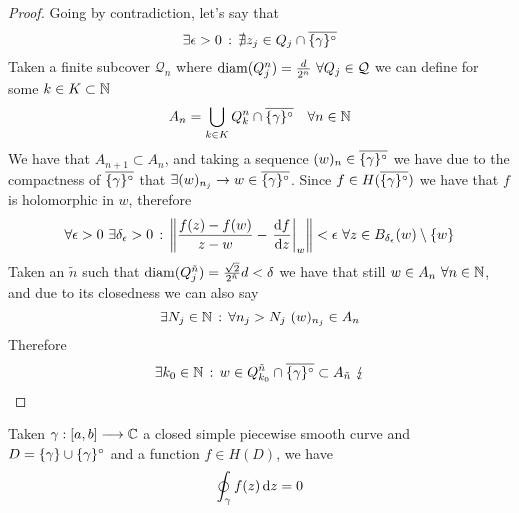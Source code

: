 \documentclass[../complete.tex]{subfiles}
\begin{document}
\begin{proof}
	Going by contradiction, let's say that
	\begin{equation*}
		\exists\epsilon>0\, :\, \nexists z_j\in Q_j\cap\overline{\{\gamma\}^{\circ}}
	\end{equation*}
	Taken a finite subcover $\mathcal{Q}_n$ where $\operatorname{diam}(Q^n_j)=\frac{d}{2^n}\ \forall Q_j\in\mathcal{Q}$ we can define for some $k\in K\subset\mathbb{N}$
	\begin{equation*}
		A_n=\bigcup_{k\in K}Q^n_{k}\cap\overline{\{\gamma\}^{\circ}}\quad\forall n\in\mathbb{N}
	\end{equation*}
	We have that $A_{n+1}\subset A_n$, and taking a sequence $(w)_n\in\overline{\{\gamma\}^{\circ}}$ we have due to the compactness of $\overline{\{\gamma\}^{\circ}}$ that $\exists(w)_{n_j}\to w\in\overline{\{\gamma\}^{\circ}}$. Since $f\in H(\overline{\{\gamma\}^{\circ}})$ we have that $f$ is holomorphic in $w$, therefore
	\begin{equation*}
		\forall\epsilon>0\ \exists\delta_\epsilon>0\st\norm{\frac{f(z)-f(w)}{z-w}-\left.\derivative{f}{z}\right|_w}<\epsilon\ \forall z\in B_{\delta_\epsilon}(w)\setminus\{w\}
	\end{equation*}
	Taken an $\tilde{n}$ such that $\operatorname{diam}(Q^{\tilde{n}}_j)=\frac{\sqrt{2}}{2^{\tilde{n}}}d<\delta$ we have that still $w\in A_n\ \forall n\in\mathbb{N}$, and due to its closedness we can also say
	\begin{equation*}
		\exists N_j\in\N\st\forall n_j>N_j\ (w)_{n_j}\in A_n
	\end{equation*}
	Therefore
	\begin{equation*}
		\exists k_0\in\mathbb{N}\, :\,  w\in Q^{\tilde{n}}_{k_0}\cap\overline{\{\gamma\}^{\circ}}\subset A_{\tilde{n}}\ \lightning
	\end{equation*}
\end{proof}
\begin{thm}
	Taken $\gamma:[a,b]\overset{}{\longrightarrow}\mathbb{C}$ a closed simple piecewise smooth curve and $D=\{\gamma\}\cup\{\gamma\}^{\circ}$ and a function $f\in H(D)$, we have
	\begin{equation}
		\oint_{\gamma}f(z)\operatorname{d\!} z=0
		\label{eq:cauchygoursat}
	\end{equation}
\end{thm}
\end{document}
